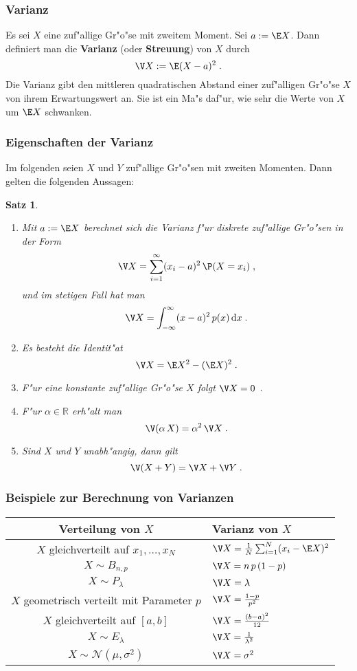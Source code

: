 \documentclass[ngerman,draft,parskip=half,twoside]{scrartcl}
\newtheorem{thm}{Satz}[section]
\newcommand*{\R}{\mathbb{R}}      %
\begin{document}
\subsubsection{Varianz}
Es sei $X$ eine zuf"allige Gr"o"se mit zweitem Moment. Sei $a:=\E X$. Dann definiert man
die \textbf{Varianz} (oder \textbf{Streuung}) von $X$ durch
$$
\V X:= \E(X-a)^2\;.
$$
Die Varianz gibt den mittleren quadratischen Abstand einer zuf"alligen Gr"o"se $X$ von ihrem
Erwartungswert an. Sie ist ein Ma"s daf"ur, wie sehr die Werte von $X$ um $\E X$ schwanken.

\subsubsection{Eigenschaften der Varianz}
Im folgenden seien $X$ und $Y$ zuf"allige Gr"o"sen mit zweiten Momenten. Dann gelten die
folgenden Aussagen$\colon$
\begin{thm}~
\begin{enumerate}
\item
Mit $a:=\E X$ berechnet sich die Varianz f"ur diskrete zuf"allige Gr"o"sen in der Form
$$
\V X = \sum_{i=1}^\infty (x_i-a)^2\,\P(X=x_i)\;,
$$
und im stetigen Fall hat man
$$
\V X =\int_{-\infty}^\infty (x-a)^2\,p(x)\,\mathrm d x\;.
$$
\item
Es besteht die Identit"at
$$
\V X = \E X^2 -(\E X)^2\;.
$$
\item
F"ur eine konstante zuf"allige Gr"o"se $X$ folgt $\V X=0$ .
\item
F"ur $\alpha\in\R$ erh"alt man
$$
\V(\alpha\,X)=\alpha^2\,\V X\;.
$$
\item
Sind $X$ und $Y$ unabh"angig, dann gilt
$$
\V(X+Y)=\V X + \V Y\;.
$$
\end{enumerate}

\end{thm}
\subsubsection{Beispiele zur Berechnung von Varianzen}

\medskip

{\renewcommand{\arraystretch}{1.4}
\begin{center}
\begin{tabular}{|c|l|}\hline
\bf Verteilung von $X$& \bf Varianz von $X$\\ \hline\hline
$X$ gleichverteilt auf $x_1,\ldots,x_N$& $\V X=\frac{1}{N}\sum_{i=1}^N (x_i-\E X)^2$\\ \hline
$X\sim B_{n,p}$& $\V X= n\,p\,(1-p)$\\ \hline
$X\sim P_\lambda$&$\V X= \lambda$\\ \hline
$X$ geometrisch verteilt mit Parameter $p$& $\V X = \frac{1-p}{p^2}$\\ \hline
$X$ gleichverteilt auf $[a,b]$& $\V X= \frac{(b-a)^2}{12}$\\ \hline
$X\sim E_\lambda$& $\V X = \frac{1}{\lambda^2}$\\ \hline
$X\sim \mathcal N(\mu,\sigma^2)$&$ \V X = \sigma^2$\\ \hline
\end{tabular}
\end{center}
}
\end{document}
